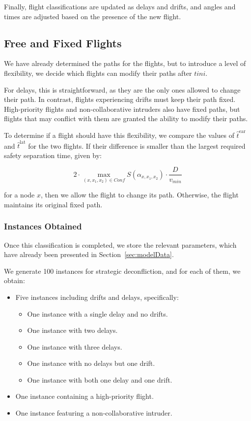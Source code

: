 \documentclass[../../thesis.tex]{subfiles}
\begin{document}
Finally, flight classifications are updated as delays and drifts, and angles and times are adjusted based on the presence of the new flight.\newline

\subsection{Free and Fixed Flights}

We have already determined the paths for the flights, but to introduce a level of flexibility, we decide which flights can modify their paths after \( tini \).  

For delays, this is straightforward, as they are the only ones allowed to change their path. In contrast, flights experiencing drifts must keep their path fixed.  
High-priority flights and non-collaborative intruders also have fixed paths, but flights that may conflict with them are granted the ability to modify their paths.  

To determine if a flight should have this flexibility, we compare the values of \( \hat{t}^\text{ear} \) and \( \hat{t}^\text{lat} \) for the two flights. If their difference is smaller than the largest required safety separation time, given by:  

\[
2\cdot\max_{(x,x_1,x_2)\in Conf} S(\alpha_{x,x_1,x_2})\cdot \frac{D}{v_{min}}
\]

for a node \( x \), then we allow the flight to change its path. Otherwise, the flight maintains its original fixed path.  

\subsubsection{Instances Obtained}

Once this classification is completed, we store the relevant parameters, which have already been presented in Section~\ref{sec:modelData}.

We generate 100 instances for strategic deconfliction, and for each of them, we obtain:  

\begin{itemize}
    \item Five instances including drifts and delays, specifically:
    \begin{itemize}
        \item One instance with a single delay and no drifts.
        \item One instance with two delays.
        \item One instance with three delays.
        \item One instance with no delays but one drift.
        \item One instance with both one delay and one drift.
    \end{itemize}
    \item One instance containing a high-priority flight.
    \item One instance featuring a non-collaborative intruder.
\end{itemize}
\end{document}
